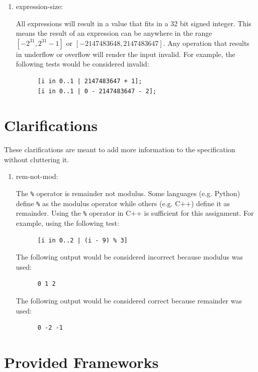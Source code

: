 \documentclass{article}
\newcommand{\code}[1]{\texttt{\textmd{#1}}}
\newcommand{\assertiondest}[1]{\hypertarget{#1}{#1:}}
\newcommand{\calrificationdest}[1]{\hypertarget{#1}{#1:}}
\begin{document}
\begin{enumerate}
    would be considered invalid:
    \begin{lstlisting}
      [i in 0..1 | -1];
      [i in 0..1 | 2147483648];
      [i in 0..2147483648 | 0];
      [i in -1..1 | 0];
    \end{lstlisting}
  \item
    \assertiondest{expression-size}
    All expressions will result in a value that fits in a 32 bit signed integer. This means the
    result of an expression can be anywhere in the range $[-2^{31}, 2^{31} - 1]$ or $[-2147483648,
    2147483647]$. Any operation that results in underflow or overflow will render the input
    invalid. For example, the following tests would be considered invalid:
    \begin{lstlisting}
      [i in 0..1 | 2147483647 + 1];
      [i in 0..1 | 0 - 2147483647 - 2];
    \end{lstlisting}
\end{enumerate}

\section{Clarifications}
These clarifications are meant to add more information to the specification without cluttering it.
\begin{enumerate}
  \item
    \calrificationdest{rem-not-mod}
    The \code{\%} operator is remainder not modulus. Some languages (e.g. Python) define \code{\%}
    as the modulus operator while others (e.g. C++) define it as remainder. Using the \code{\%}
    operator in C++ is sufficient for this assignment. For example, using the
    following test:
    \begin{lstlisting}
      [i in 0..2 | (i - 9) % 3]
    \end{lstlisting}
    The following output would be considered incorrect because modulus was used:
    \begin{lstlisting}
      0 1 2
    \end{lstlisting}
    The following output would be considered correct because remainder was used:
    \begin{lstlisting}
      0 -2 -1
    \end{lstlisting}
\end{enumerate}

\section{Provided Frameworks}
\end{document}
